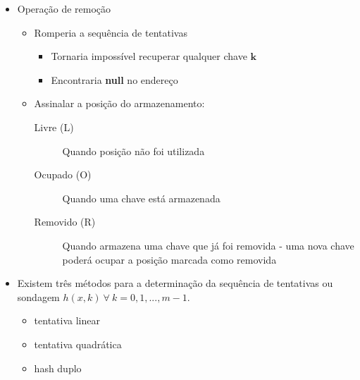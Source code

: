 \documentclass{beamer}
\begin{document}
\begin{frame}
 \begin{itemize}
  \item Operação de remoção 
  \begin{itemize}
   \item Romperia a sequência de tentativas
   \begin{itemize}
    \item Tornaria impossível recuperar qualquer chave $\mathbf{k}$
    \item Encontraria \textbf{null} no endereço
   \end{itemize}

   \item Assinalar a posição do armazenamento: 
   \begin{description}
    \item[Livre (L)] Quando posição não foi utilizada
    \item[Ocupado (O)] Quando uma chave está armazenada
    \item[Removido (R)] Quando armazena uma chave que já foi removida - uma nova chave poderá ocupar a posição marcada como removida
   \end{description}
  \end{itemize}
  \end{itemize}

\end{frame}


\begin{frame}
 \begin{itemize}
  \item Existem três métodos para a determinação da sequência de tentativas ou sondagem $h(x,k)\ \forall \ k = 0,1,...,m-1$.
  \begin{itemize}
   \item tentativa linear 
   \item tentativa quadrática
   \item hash duplo
  \end{itemize}

 \end{itemize}

\end{frame}
\end{document}
